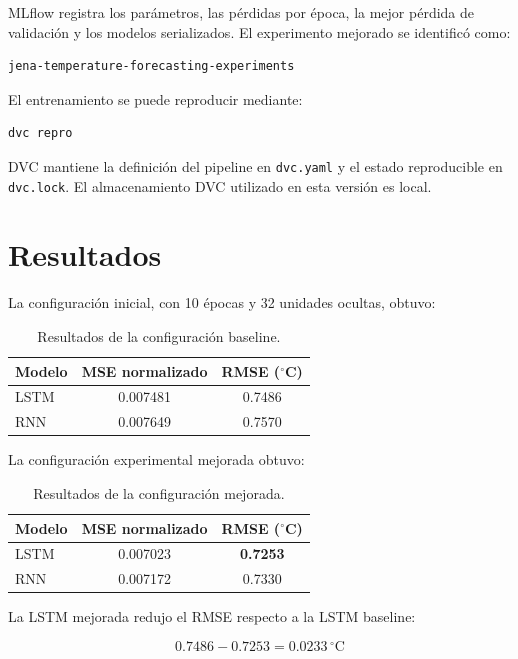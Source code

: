 \documentclass[conference]{IEEEtran}
\begin{document}
MLflow registra los parámetros, las pérdidas por época, la mejor pérdida de
validación y los modelos serializados. El experimento mejorado se identificó
como:

\begin{lstlisting}
jena-temperature-forecasting-experiments
\end{lstlisting}

El entrenamiento se puede reproducir mediante:

\begin{lstlisting}[language=bash]
dvc repro
\end{lstlisting}

DVC mantiene la definición del pipeline en \texttt{dvc.yaml} y el estado
reproducible en \texttt{dvc.lock}. El almacenamiento DVC utilizado en esta
versión es local.

\section{Resultados}

La configuración inicial, con 10 épocas y 32 unidades ocultas, obtuvo:

\begin{table}[h]
\centering
\caption{Resultados de la configuración baseline.}
\begin{tabular}{lcc}
\toprule
Modelo & MSE normalizado & RMSE ($^\circ$C) \\
\midrule
LSTM & 0.007481 & 0.7486 \\
RNN  & 0.007649 & 0.7570 \\
\bottomrule
\end{tabular}
\end{table}

La configuración experimental mejorada obtuvo:

\begin{table}[h]
\centering
\caption{Resultados de la configuración mejorada.}
\begin{tabular}{lcc}
\toprule
Modelo & MSE normalizado & RMSE ($^\circ$C) \\
\midrule
LSTM & 0.007023 & \textbf{0.7253} \\
RNN  & 0.007172 & 0.7330 \\
\bottomrule
\end{tabular}
\end{table}

La LSTM mejorada redujo el RMSE respecto a la LSTM baseline:

\[
0.7486 - 0.7253 = 0.0233\,^\circ\mathrm{C}
\]
\end{document}
